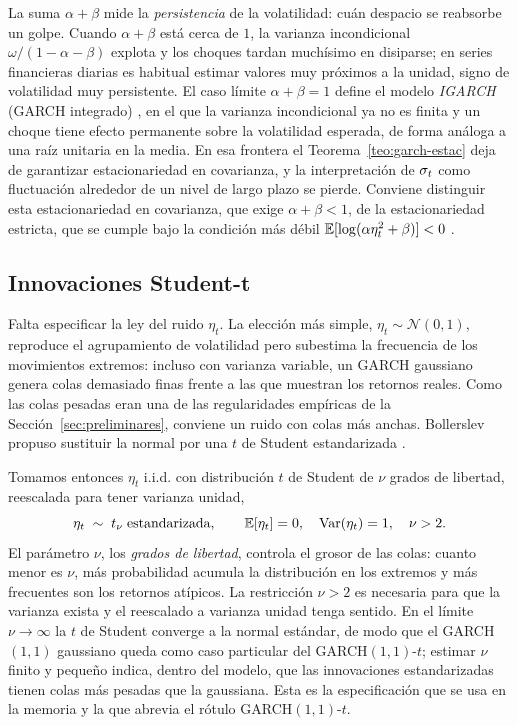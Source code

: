 La suma $\alpha + \beta$ mide la \emph{persistencia} de la volatilidad: cuán despacio se reabsorbe un golpe. Cuando $\alpha + \beta$ está cerca de $1$, la varianza incondicional $\omega/(1-\alpha-\beta)$ explota y los choques tardan muchísimo en disiparse; en series financieras diarias es habitual estimar valores muy próximos a la unidad, signo de volatilidad muy persistente. El caso límite $\alpha + \beta = 1$ define el modelo \emph{IGARCH} (GARCH integrado) \cite{englebollerslev1986}, en el que la varianza incondicional ya no es finita y un choque tiene efecto permanente sobre la volatilidad esperada, de forma análoga a una raíz unitaria en la media. En esa frontera el Teorema~\ref{teo:garch-estac} deja de garantizar estacionariedad en covarianza, y la interpretación de $\sigma_t$ como fluctuación alrededor de un nivel de largo plazo se pierde. Conviene distinguir esta estacionariedad en covarianza, que exige $\alpha+\beta<1$, de la estacionariedad estricta, que se cumple bajo la condición más débil $\mathbb{E}[\log(\alpha \eta_t^2+\beta)]<0$ \cite{nelson1990}.

\subsection{Innovaciones Student-t}
\label{sec:garch-t}

Falta especificar la ley del ruido $\eta_t$. La elección más simple, $\eta_t \sim \mathcal{N}(0,1)$, reproduce el agrupamiento de volatilidad pero subestima la frecuencia de los movimientos extremos: incluso con varianza variable, un GARCH gaussiano genera colas demasiado finas frente a las que muestran los retornos reales. Como las colas pesadas eran una de las regularidades empíricas de la Sección~\ref{sec:preliminares}, conviene un ruido con colas más anchas. Bollerslev propuso sustituir la normal por una $t$ de Student estandarizada \cite{bollerslev1987}.

Tomamos entonces $\eta_t$ i.i.d. con distribución $t$ de Student de $\nu$ grados de libertad, reescalada para tener varianza unidad,
\[
\eta_t \;\sim\; t_\nu \;\text{estandarizada}, \qquad \mathbb{E}[\eta_t] = 0, \quad \operatorname{Var}(\eta_t) = 1, \quad \nu > 2.
\]
El parámetro $\nu$, los \emph{grados de libertad}, controla el grosor de las colas: cuanto menor es $\nu$, más probabilidad acumula la distribución en los extremos y más frecuentes son los retornos atípicos. La restricción $\nu > 2$ es necesaria para que la varianza exista y el reescalado a varianza unidad tenga sentido. En el límite $\nu \to \infty$ la $t$ de Student converge a la normal estándar, de modo que el GARCH$(1,1)$ gaussiano queda como caso particular del GARCH$(1,1)$-$t$; estimar $\nu$ finito y pequeño indica, dentro del modelo, que las innovaciones estandarizadas tienen colas más pesadas que la gaussiana. Esta es la especificación que se usa en la memoria y la que abrevia el rótulo GARCH$(1,1)$-$t$.

